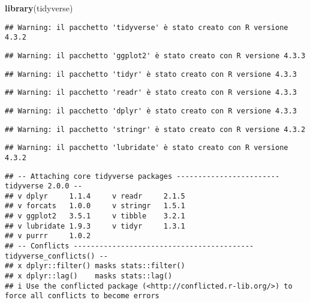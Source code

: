 \documentclass[
]{book}
\newenvironment{Shaded}{\begin{snugshade}}{\end{snugshade}}
\newcommand{\FunctionTok}[1]{\textcolor[rgb]{0.13,0.29,0.53}{\textbf{#1}}}
\newcommand{\NormalTok}[1]{#1}
\theoremstyle{definition}
\theoremstyle{definition}
\theoremstyle{definition}
\theoremstyle{definition}
\theoremstyle{remark}
\begin{document}
\begin{Shaded}
\begin{Highlighting}[]
\FunctionTok{library}\NormalTok{(tidyverse)}
\end{Highlighting}
\end{Shaded}

\begin{verbatim}
## Warning: il pacchetto 'tidyverse' è stato creato con R versione 4.3.2
\end{verbatim}

\begin{verbatim}
## Warning: il pacchetto 'ggplot2' è stato creato con R versione 4.3.3
\end{verbatim}

\begin{verbatim}
## Warning: il pacchetto 'tidyr' è stato creato con R versione 4.3.3
\end{verbatim}

\begin{verbatim}
## Warning: il pacchetto 'readr' è stato creato con R versione 4.3.3
\end{verbatim}

\begin{verbatim}
## Warning: il pacchetto 'dplyr' è stato creato con R versione 4.3.3
\end{verbatim}

\begin{verbatim}
## Warning: il pacchetto 'stringr' è stato creato con R versione 4.3.2
\end{verbatim}

\begin{verbatim}
## Warning: il pacchetto 'lubridate' è stato creato con R versione 4.3.2
\end{verbatim}

\begin{verbatim}
## -- Attaching core tidyverse packages ------------------------ tidyverse 2.0.0 --
## v dplyr     1.1.4     v readr     2.1.5
## v forcats   1.0.0     v stringr   1.5.1
## v ggplot2   3.5.1     v tibble    3.2.1
## v lubridate 1.9.3     v tidyr     1.3.1
## v purrr     1.0.2     
## -- Conflicts ------------------------------------------ tidyverse_conflicts() --
## x dplyr::filter() masks stats::filter()
## x dplyr::lag()    masks stats::lag()
## i Use the conflicted package (<http://conflicted.r-lib.org/>) to force all conflicts to become errors
\end{verbatim}
\end{document}
